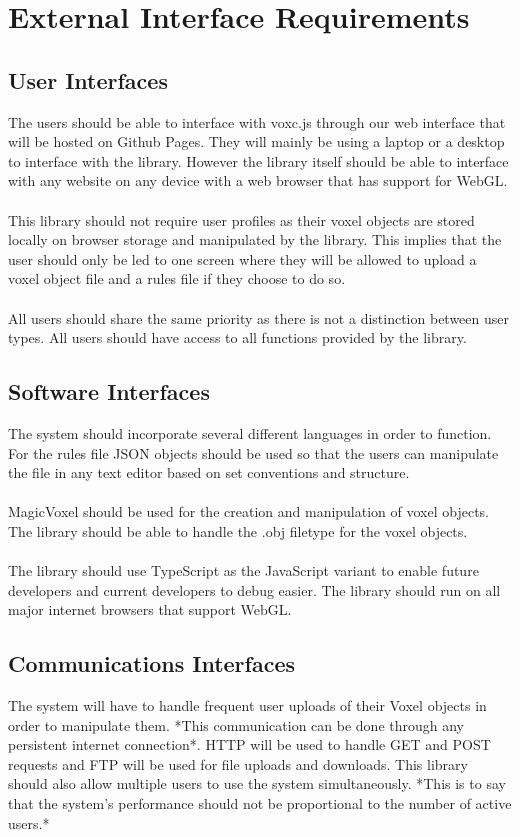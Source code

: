 \documentclass[english]{article}
\begin{document}
	\pagebreak
	
	\section{External Interface Requirements}
	
		\subsection{User Interfaces}
		The users should be able to interface with voxc.js through our web interface that will be hosted on Github Pages. They will mainly be using a laptop or a desktop to interface with the library. However the library itself should be able to interface with any website on any device with a web browser that has support for WebGL.
		\\\\
		This library should not require user profiles as their voxel objects are stored locally on browser storage and manipulated by the library. This implies that the user should only be led to one screen where they will be allowed to upload a voxel object file and a rules file if they choose to do so.
		\\\\
		All users should share the same priority as there is not a distinction between user types. All users should have access to 
		all functions provided by the library.
		
		\subsection{Software Interfaces}
		The system should incorporate several different languages in order to function. For the rules file JSON objects should be 
		used so that the users can manipulate the file in any text editor based on set conventions and structure. 
		\\\\
		MagicVoxel should be used for the creation and manipulation of voxel objects. The library should be able to handle the .obj filetype for the voxel objects.
		\\\\
	 	The library should use TypeScript as the JavaScript variant to enable future developers and current developers to debug easier. The library should run on all major internet browsers that support WebGL.
		
		\subsection{Communications Interfaces}
		The system will have to handle frequent user uploads of their Voxel objects in order to manipulate them. *This
		communication can be done through any persistent internet connection*. HTTP will be used to handle GET and POST requests and FTP will be used for file uploads and downloads. This library should also allow multiple users to use the system simultaneously. *This is to say that the system's performance should not be proportional to the number of active users.*
		
\end{document}
